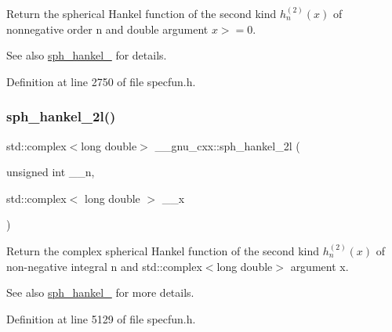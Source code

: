 Return the spherical Hankel function of the second kind $ h^{(2)}_n(x)$ of nonnegative order n and { double} argument $ x >= 0 $.

\begin{DoxySeeAlso}{See also}
\hyperlink{group__mathsf__gnu_ga1ca08866a25e3637b04c57ff5a0c36a5}{sph\+\_\+hankel\+\_} for details. 
\end{DoxySeeAlso}


Definition at line 2750 of file specfun.\+h.

\mbox{\label{group__mathsf__gnu_ga3d9d9aaceba455a5ddc79d178ee1cb6d}} 
\subsubsection{\texorpdfstring{sph\+\_\+hankel\+\_\+2l()}{sph\_hankel\_2l()}\hspace{0.1cm}{\footnotesize\ttfamily [2/2]}}
{\footnotesize\ttfamily std\+::complex$<$long double$>$ \+\_\+\+\_\+gnu\+\_\+cxx\+::sph\+\_\+hankel\+\_\+2l (\begin{DoxyParamCaption}\item[{unsigned int}]{\+\_\+\+\_\+n,  }\item[{std\+::complex$<$ long double $>$}]{\+\_\+\+\_\+x }\end{DoxyParamCaption})\hspace{0.3cm}{\ttfamily [inline]}}

Return the complex spherical Hankel function of the second kind $ h^{(2)}_n(x) $ of non-\/negative integral {\ttfamily n} and {\ttfamily std\+::complex$<$long double$>$} argument {\ttfamily x}.

\begin{DoxySeeAlso}{See also}
\hyperlink{group__mathsf__gnu_ga1ca08866a25e3637b04c57ff5a0c36a5}{sph\+\_\+hankel\+\_} for more details. 
\end{DoxySeeAlso}


Definition at line 5129 of file specfun.\+h.

\mbox{\label{group__mathsf__gnu_gacbff28988d5d36f0c3b3fe03d4f57896}} 
